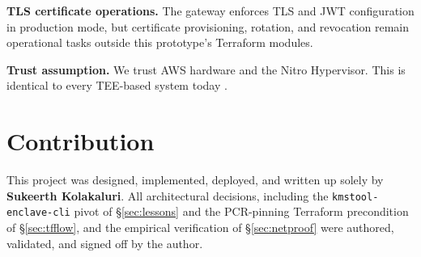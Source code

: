 \documentclass[11pt]{article}
\begin{document}
\textbf{TLS certificate operations.} The gateway enforces TLS and JWT
configuration in production mode, but certificate provisioning,
rotation, and revocation remain operational tasks outside this
prototype's Terraform modules.

\textbf{Trust assumption.} We trust AWS hardware and the Nitro
Hypervisor. This is identical to every TEE-based system today
\cite{sgxexplained,cccsurvey}.

\section{Contribution}

This project was designed, implemented, deployed, and written up
solely by \textbf{Sukeerth Kolakaluri}. All architectural decisions,
including the
\texttt{kmstool-enclave-cli} pivot of \S\ref{sec:lessons} and the
PCR-pinning Terraform precondition of \S\ref{sec:tfflow}, and
the empirical verification of \S\ref{sec:netproof} were authored,
validated, and signed off by the author.
\end{document}
